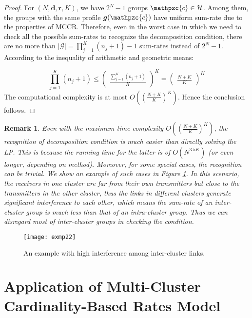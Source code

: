 \documentclass[10pt,onecolumn,journal,draftcls,oneside]{IEEEtran}
\newcounter{cond}
\newcounter{rema}
\newtheorem{remark}[rema]{Remark}
\newcounter{exam}
\newcommand{\CH}{\mathcal{H}}
\newcommand{\Cc}{\mathpzc{c}}
\newcommand{\CG}{\mathcal{G}}
\newcommand{\Bd}{\boldsymbol{d}}
\newcommand{\Br}{\boldsymbol{r}}
\newcommand{\Bg}{\boldsymbol{g}}
\begin{document}
\begin{proof}
For $(N, \Bd, \Br, K)$, we have $2^N-1$ groups $\Cc \in \CH$. Among them, the groups with the same profile $\Bg(\Cc)$ have uniform sum-rate due to the properties of MCCR. Therefore, even in the worst case in which we need to check all the possible sum-rates to recognize the decomposition condition, there are no more than $|\CG| = \prod_{j=1}^K{(n_j+1)}-1$ sum-rates instead of $2^N-1$. According to the inequality of arithmetic and geometric means:

\begin{equation}
\prod_{j=1}^K{(n_j+1)} \leq \left(\begin{array}{c}\frac{\sum_{j=1}^K{(n_j+1)}}{K}\end{array}\right)^K = \left(\begin{array}{c}\frac{N+K}{K}\end{array}\right)^K 
\end{equation}
The computational complexity is at most $O((\frac{N+K}{K})^K)$. Hence the conclusion follows.
\end{proof}

\begin{remark}

Even with the maximum time complexity $O((\frac{N+K}{K})^K)$, the recognition of decomposition condition is much easier than directly solving the LP.
This is because the running time for the latter is of $O(N^{3.5K})$ (or even longer, depending on method).
Moreover, for some special cases, the recognition can be trivial. We show an example of such cases in Figure \ref{fig:exmp2}.
In this scenario, the receivers in one cluster are far from their own transmitters but close to the transmitters in the other cluster, thus the links in different clusters generate significant interference to each other, which means the sum-rate of an inter-cluster group is much less than that of an intra-cluster group. Thus we can disregard most of inter-cluster groups in checking the condition.
\end{remark}


\begin{figure} [ht!]	
\centering
{\texttt{[image: exmp22]}}
\vspace{-2mm}
\caption{An example with high interference among inter-cluster links.}
\label{fig:exmp2}
\end{figure}

\section{Application of Multi-Cluster Cardinality-Based Rates Model}
\label{sec:algorithm}
\end{document}
